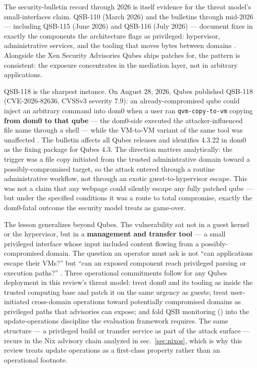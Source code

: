 \documentclass[
  english,
  9pt,
]{extarticle}
\begin{document}
The security-bulletin record through 2026 is itself evidence for the
threat model's small-interfaces claim. QSB-110 (March 2026) and the
bulletins through mid-2026 --- including QSB-115 (June 2026) and QSB-116
(July 2026) --- document fixes in exactly the components the
architecture flags as privileged: hypervisor, administrative services,
and the tooling that moves bytes between domains
\citep{qsb_110, qsb_115, qsb_116}. Alongside the Xen Security Advisories
Qubes ships patches for, the pattern is consistent: the exposure
concentrates in the mediation layer, not in arbitrary applications.

QSB-118 is the sharpest instance. On August 28, 2026, Qubes published
QSB-118 (CVE-2026-82636, CVSSv3 severity 7.9): an already-compromised
qube could inject an arbitrary command into dom0 when a user ran
\texttt{qvm-copy-to-vm} copying \textbf{from dom0 to that qube} --- the
dom0-side  executed the attacker-influenced
file name through a shell --- while the VM-to-VM variant of the same
tool was unaffected \citep{qsb_118}. The bulletin affects all Qubes
releases and identifies  4.3.22 in dom0 as
the fixing package for Qubes 4.3. The direction matters analytically:
the trigger was a file copy initiated from the trusted administrative
domain toward a possibly-compromised target, so the attack entered
through a routine administrative workflow, not through an exotic
guest-to-hypervisor escape. This was not a claim that any webpage could
silently escape any fully patched qube --- but under the specified
conditions it was a route to total compromise, exactly the dom0-fatal
outcome the security model treats as game-over.

The lesson generalizes beyond Qubes. The vulnerability sat not in a
guest kernel or the hypervisor, but in a \textbf{management and transfer
tool} --- a small privileged interface whose input included content
flowing from a possibly-compromised domain. The question an operator
must ask is not ``can applications escape their VMs?'' but ``can an
exposed component reach privileged parsing or execution paths?''
\citep{qsb_118}. Three operational commitments follow for any Qubes
deployment in this review's threat model: treat dom0 and its tooling as
inside the trusted computing base and patch it on the same urgency as
guests; treat user-initiated cross-domain operations toward potentially
compromised domains as privileged paths that advisories can expose; and
fold QSB monitoring (\citep{qubes_qsb_index}) into the update-operations
discipline the evaluation framework requires. The same structure --- a
privileged build or transfer service as part of the attack surface ---
recurs in the Nix advisory chain analyzed in sec.~\ref{sec:nixos}, which
is why this review treats update operations as a first-class property
rather than an operational footnote.
\end{document}
